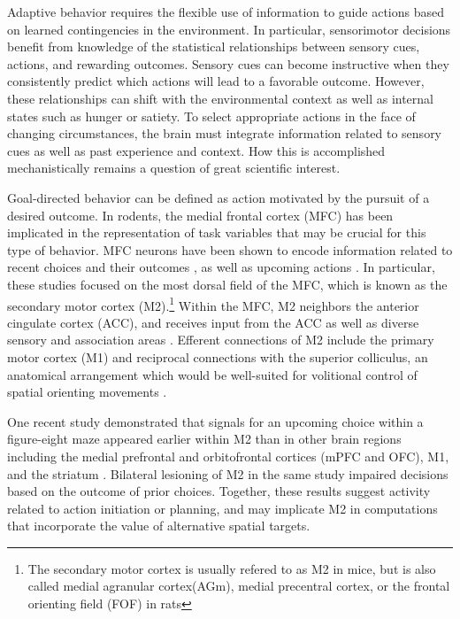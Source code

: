 
\fancyhead[L]{} 

\setcounter{chapter}{0}
\renewcommand{\thefigure}{\thechapter.\arabic{figure}}

Adaptive behavior requires the flexible use of information to guide actions based on learned contingencies in the environment. In particular, sensorimotor decisions benefit from knowledge of the statistical relationships between sensory cues, actions, and rewarding outcomes. Sensory cues can become instructive when they consistently predict which actions will lead to a favorable outcome. However, these relationships can shift with the environmental context as well as internal states such as hunger or satiety. To select appropriate actions in the face of changing circumstances, the brain must integrate information related to sensory cues as well as past experience and context. How this is accomplished mechanistically remains a question of great scientific interest. 

Goal-directed behavior can be defined as action motivated by the pursuit of a desired outcome. In rodents, the medial frontal cortex (MFC) has been implicated in the representation of task variables that may be crucial for this type of behavior. MFC neurons have been shown to encode information related to recent choices and their outcomes \citep{sul2011role,yuan2015cortical,siniscalchi2019enhanced,mao2019cortical}, as well as upcoming actions \citep{sul2011role,erlich2011cortical,murakami2014neural}. In particular, these studies focused on the most dorsal field of the MFC, which is known as the secondary motor cortex (M2).\footnote{The secondary motor cortex is usually refered to as M2 in mice, but is also called medial agranular cortex(AGm), medial precentral cortex, or the frontal orienting field (FOF) in rats} Within the MFC, M2 neighbors the anterior cingulate cortex (ACC), and receives input from the ACC as well as diverse sensory and association areas \citep{reep1984afferent,reep1999topographic,hoover2007anatomical}. Efferent connections of M2 include the primary motor cortex (M1) and reciprocal connections with the superior colliculus, an anatomical arrangement which would be well-suited for volitional control of spatial orienting movements \citep{erlich2011cortical,barthas2017secondary}. 



One recent study demonstrated that signals for an upcoming choice within a figure-eight maze appeared earlier within M2 than in other brain regions including the medial prefrontal and orbitofrontal cortices (mPFC and OFC), M1, and the striatum \citep{sul2011role}. Bilateral lesioning of M2 in the same study impaired decisions based on the outcome of prior choices. Together, these results suggest activity related to action initiation or planning, and may implicate M2 in computations that incorporate the value of alternative spatial targets.  

